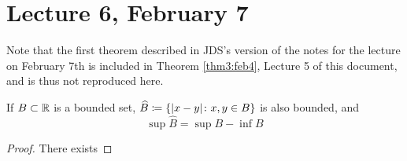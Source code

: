 \chapter*{Lecture 6, February 7}
\setcounter{chapter}{6}
\setcounter{section}{0}

Note that the first theorem described in JDS's version of the notes for the lecture on February 7th is included in Theorem \ref{thm3:feb4}, Lecture 5 of this document, and is thus not reproduced here.

\begin{thm}
  If $B \subset \mathbb{R}$ is a bounded set, $\widehat{B} \coloneqq \{\abs{x-y} \colon x, y \in B \}$ is also bounded, and
  \[
    \sup\widehat{B} = \sup B - \inf B
  \]
\end{thm}

\begin{proof}
  There exists
\end{proof}
